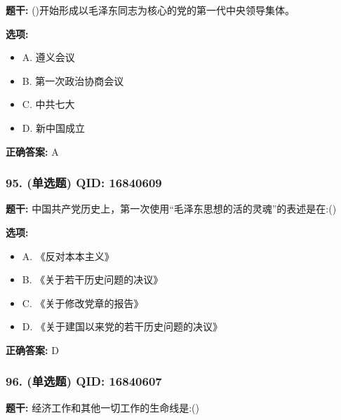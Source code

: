 \documentclass[12pt,UTF8]{ctexart}
\begin{document}
\textbf{题干:}
()开始形成以毛泽东同志为核心的党的第一代中央领导集体。

\textbf{选项:}
\begin{itemize}[leftmargin=*]

  \item A. 遵义会议

  \item B. 第一次政治协商会议

  \item C. 中共七大

  \item D. 新中国成立

\end{itemize}

\textbf{正确答案:}
A

\vspace{0.3em}\hrulefill\vspace{0.7em}

\subsubsection*{95. (单选题) \small QID: 16840609}

\textbf{题干:}
中国共产党历史上，第一次使用“毛泽东思想的活的灵魂”的表述是在:()

\textbf{选项:}
\begin{itemize}[leftmargin=*]

  \item A. 《反对本本主义》

  \item B. 《关于若干历史问题的决议》

  \item C. 《关于修改党章的报告》

  \item D. 《关于建国以来党的若干历史问题的决议》

\end{itemize}

\textbf{正确答案:}
D

\vspace{0.3em}\hrulefill\vspace{0.7em}

\subsubsection*{96. (单选题) \small QID: 16840607}

\textbf{题干:}
经济工作和其他一切工作的生命线是:()
\end{document}
